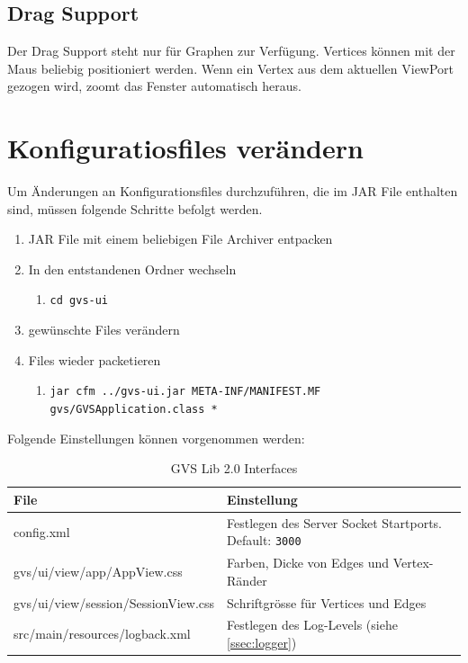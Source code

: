 \documentclass[11pt,a4paper,english,oneside]{book}
\numberwithin{equation}{chapter}
\begin{document}
	\subsection{Drag Support}
	Der Drag Support steht nur für Graphen zur Verfügung. Vertices können mit der Maus beliebig positioniert werden. Wenn ein Vertex aus dem aktuellen ViewPort gezogen wird, zoomt das Fenster automatisch heraus.
		
	\clearpage
	
	\section{Konfiguratiosfiles verändern}
	Um Änderungen an Konfigurationsfiles durchzuführen, die im JAR File enthalten sind, müssen folgende Schritte befolgt werden.
	
	\begin{enumerate}
		\item JAR File mit einem beliebigen File Archiver entpacken
		\item In den entstandenen Ordner wechseln
		\begin{enumerate}
			\item \lstinline{cd gvs-ui}
		\end{enumerate}
		\item gewünschte Files verändern
		\item Files wieder packetieren
		\begin{enumerate}
			\item \lstinline{jar cfm ../gvs-ui.jar META-INF/MANIFEST.MF gvs/GVSApplication.class *}
		\end{enumerate}
	\end{enumerate}

	Folgende Einstellungen können vorgenommen werden:
	
		\begin{table}[h!]
		\centering
		\begin{tabularx}{\linewidth}{l X}
			\toprule 
			File & Einstellung \\
			\midrule
			config.xml & Festlegen des Server Socket Startports. Default: \lstinline{3000} \\
			gvs/ui/view/app/AppView.css & Farben, Dicke von Edges und Vertex-Ränder \\
			gvs/ui/view/session/SessionView.css & Schriftgrösse für Vertices und Edges\\
			src/main/resources/logback.xml & Festlegen des Log-Levels (siehe \ref{ssec:logger})\\
			\bottomrule 
		\end{tabularx} 
		\caption{GVS Lib 2.0 Interfaces} 
		\label{tbl:preferences}
	\end{table}
	
\end{document}
